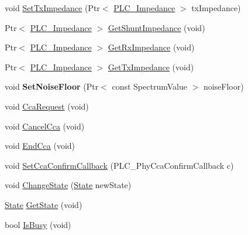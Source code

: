 \begin{DoxyCompactItemize}
void \hyperlink{classns3_1_1PLC__HalfDuplexOfdmPhy_a8633a9bbaafcccf370900b1301d1c963}{\-Set\-Tx\-Impedance} (\-Ptr$<$ \hyperlink{classns3_1_1PLC__ValueBase}{\-P\-L\-C\-\_\-\-Impedance} $>$ tx\-Impedance)
\item 
\-Ptr$<$ \hyperlink{classns3_1_1PLC__ValueBase}{\-P\-L\-C\-\_\-\-Impedance} $>$ \hyperlink{classns3_1_1PLC__HalfDuplexOfdmPhy_a22702ed1d5c608d1ba3a080df7cfedd5}{\-Get\-Shunt\-Impedance} (void)
\item 
\-Ptr$<$ \hyperlink{classns3_1_1PLC__ValueBase}{\-P\-L\-C\-\_\-\-Impedance} $>$ \hyperlink{classns3_1_1PLC__HalfDuplexOfdmPhy_a389c21538679bec18de4c624dd28c61f}{\-Get\-Rx\-Impedance} (void)
\item 
\-Ptr$<$ \hyperlink{classns3_1_1PLC__ValueBase}{\-P\-L\-C\-\_\-\-Impedance} $>$ \hyperlink{classns3_1_1PLC__HalfDuplexOfdmPhy_ab5b12c099c8f65bef93a85e2c48bd4c6}{\-Get\-Tx\-Impedance} (void)
\item 
\hypertarget{classns3_1_1PLC__HalfDuplexOfdmPhy_a8493b46e07deed0d6ab6ba91617558df}{void {\bfseries \-Set\-Noise\-Floor} (\-Ptr$<$ const \-Spectrum\-Value $>$ noise\-Floor)}\label{classns3_1_1PLC__HalfDuplexOfdmPhy_a8493b46e07deed0d6ab6ba91617558df}

\item 
void \hyperlink{classns3_1_1PLC__HalfDuplexOfdmPhy_aedcd8f1a9400e8a671736fb62fafd340}{\-Cca\-Request} (void)
\item 
void \hyperlink{classns3_1_1PLC__HalfDuplexOfdmPhy_a16299517e55127bc575d52d6f809ed7b}{\-Cancel\-Cca} (void)
\item 
void \hyperlink{classns3_1_1PLC__HalfDuplexOfdmPhy_af33d069bbe8515210d3d4417dd5bccbd}{\-End\-Cca} (void)
\item 
void \hyperlink{classns3_1_1PLC__HalfDuplexOfdmPhy_a164bdc70d4527dd9790d5cb75bc877ff}{\-Set\-Cca\-Confirm\-Callback} (\-P\-L\-C\-\_\-\-Phy\-Cca\-Confirm\-Callback c)
\item 
void \hyperlink{classns3_1_1PLC__HalfDuplexOfdmPhy_a180d9f91b00a180c05a806b5b65d7e35}{\-Change\-State} (\hyperlink{classns3_1_1PLC__HalfDuplexOfdmPhy_ae91e168f9a51bf5344e7e03d9ae13b60}{\-State} new\-State)
\item 
\hyperlink{classns3_1_1PLC__HalfDuplexOfdmPhy_ae91e168f9a51bf5344e7e03d9ae13b60}{\-State} \hyperlink{classns3_1_1PLC__HalfDuplexOfdmPhy_a9ee7d4f5414925e91038ea157eabcf4b}{\-Get\-State} (void)
\item 
bool \hyperlink{classns3_1_1PLC__HalfDuplexOfdmPhy_a39ba28f6194b993dbc5b688a419a820d}{\-Is\-Busy} (void)
\end{DoxyCompactItemize}
